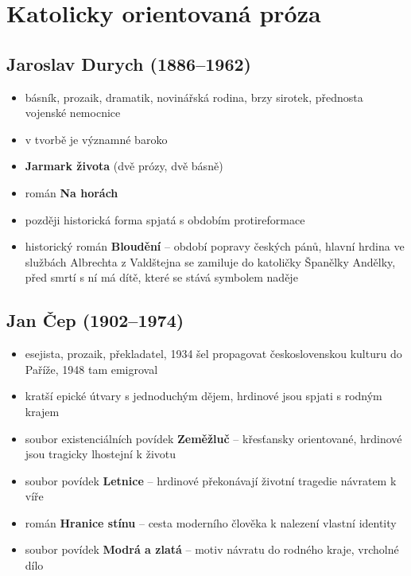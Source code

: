 \section{Katolicky orientovaná próza}

\subsection{Jaroslav Durych (1886--1962)}
\begin{itemize}
\item básník, prozaik, dramatik, novinářská rodina, brzy sirotek, přednosta vojenské nemocnice 
\item v tvorbě je významné baroko
\item \textbf{Jarmark života} (dvě prózy, dvě básně)
\item román \textbf{Na horách}
\item později historická forma spjatá s obdobím protireformace
\item historický román \textbf{Bloudění} -- období popravy českých pánů, hlavní hrdina ve službách Albrechta z Valdštejna se zamiluje do katoličky Španělky Andělky, před smrtí s ní má dítě, které se stává symbolem naděje
\end{itemize}

\subsection{Jan Čep (1902--1974)}
\begin{itemize}
\item esejista, prozaik, překladatel, 1934 šel propagovat československou kulturu do Paříže, 1948 tam emigroval
\item kratší epické útvary s jednoduchým dějem, hrdinové jsou spjati s rodným krajem
\item soubor existenciálních povídek \textbf{Zeměžluč} -- křesťansky orientované, hrdinové jsou tragicky lhostejní k životu
\item soubor povídek \textbf{Letnice} -- hrdinové překonávají životní tragedie návratem k víře
\item román \textbf{Hranice stínu} -- cesta moderního člověka k nalezení vlastní identity 
\item soubor povídek \textbf{Modrá a zlatá} -- motiv návratu do rodného kraje, vrcholné dílo
\end{itemize}

